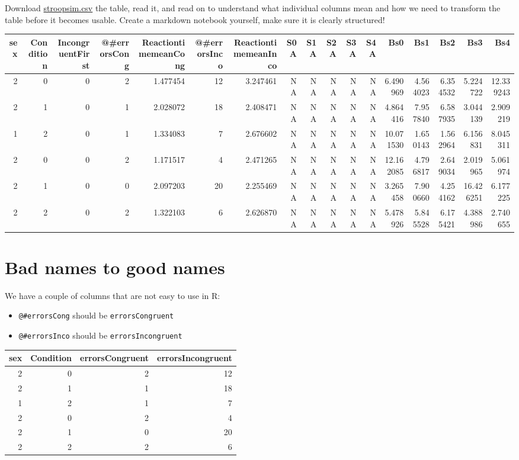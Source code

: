\documentclass[
]{book}
\providecommand{\tightlist}{%
  \setlength{\itemsep}{0pt}\setlength{\parskip}{0pt}}
\begin{document}
Download \href{data/stroopsim.csv}{stroopsim.csv} the table, read it, and read on to understand what individual columns mean and how we need to transform the table before it becomes usable. Create a markdown notebook yourself, make sure it is clearly structured!

\begin{tabular}{r|r|r|r|r|r|r|r|r|r|r|r|r|r|r|r|r}
\hline
sex & Condition & IncongruentFirst & @\#errorsCong & ReactiontimemeanCong & @\#errorsInco & ReactiontimemeanInco & S0A & S1A & S2A & S3A & S4A & Bs0 & Bs1 & Bs2 & Bs3 & Bs4\\
\hline
2 & 0 & 0 & 2 & 1.477454 & 12 & 3.247461 & NA & NA & NA & NA & NA & 6.490969 & 4.564023 & 6.354532 & 5.224722 & 12.339243\\
\hline
2 & 1 & 0 & 1 & 2.028072 & 18 & 2.408471 & NA & NA & NA & NA & NA & 4.864416 & 7.957840 & 6.587935 & 3.044139 & 2.909219\\
\hline
1 & 2 & 0 & 1 & 1.334083 & 7 & 2.676602 & NA & NA & NA & NA & NA & 10.071530 & 1.650143 & 1.562964 & 6.156831 & 8.045311\\
\hline
2 & 0 & 0 & 2 & 1.171517 & 4 & 2.471265 & NA & NA & NA & NA & NA & 12.162085 & 4.796817 & 2.649034 & 2.019965 & 5.061974\\
\hline
2 & 1 & 0 & 0 & 2.097203 & 20 & 2.255469 & NA & NA & NA & NA & NA & 3.265458 & 7.900660 & 4.254162 & 16.426251 & 6.177225\\
\hline
2 & 2 & 0 & 2 & 1.322103 & 6 & 2.626870 & NA & NA & NA & NA & NA & 5.478926 & 5.845528 & 6.175421 & 4.388986 & 2.740655\\
\hline
\end{tabular}

\hypertarget{bad-names-to-good-names}{%
\section{Bad names to good names}\label{bad-names-to-good-names}}

We have a couple of columns that are not easy to use in R:

\begin{itemize}
\tightlist
\item
  \texttt{@\#errorsCong} should be \texttt{errorsCongruent}
\item
  \texttt{@\#errorsInco} should be \texttt{errorsIncongruent}
\end{itemize}

\begin{tabular}{r|r|r|r}
\hline
sex & Condition & errorsCongruent & errorsIncongruent\\
\hline
2 & 0 & 2 & 12\\
\hline
2 & 1 & 1 & 18\\
\hline
1 & 2 & 1 & 7\\
\hline
2 & 0 & 2 & 4\\
\hline
2 & 1 & 0 & 20\\
\hline
2 & 2 & 2 & 6\\
\hline
\end{tabular}
\end{document}
